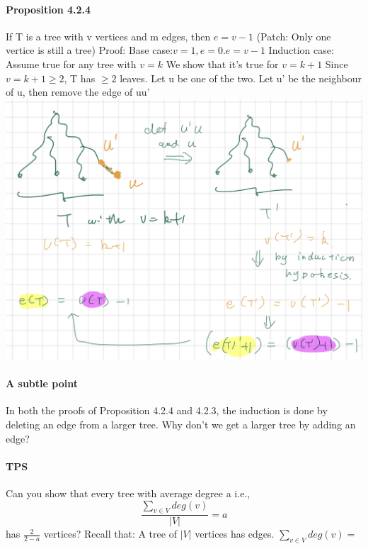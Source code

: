 \documentclass{article}
\begin{document}
\paragraph{Proposition 4.2.4}
If T is a tree with v vertices and m edges, then $e=v-1$\newline
(Patch: Only one  vertice is still a tree)\newline
Proof:\newline
Base case:\newline $v=1,e=0.e=v-1$\newline
Induction case:\newline
Assume true for any tree with $v=k$\newline
We show that it's true for $v=k+1$\newline
Since $v=k+1\ge 2$, T has $\ge 2$ leaves.\newline
Let u be one of the two.\newline
Let u' be the neighbour of u, then remove the edge of uu'\newline
\includegraphics{0064}
\paragraph{A subtle point}
In both the proofs of Proposition 4.2.4 and 4.2.3, the induction
is done by deleting an edge from a larger tree.\newline
Why don’t we get a larger tree by adding an edge?\newline
\paragraph{TPS}
Can you show that every tree with average degree a i.e.,
$$\frac{\sum_{v\in V}deg(v)}{|V|}=a$$
has $\frac{2}{2-a}$ vertices?\newline
Recall that:\newline
A tree of $|V|$ vertices has  edges.\newline
$\sum_{v\in V}deg(v)=$
\end{document}
